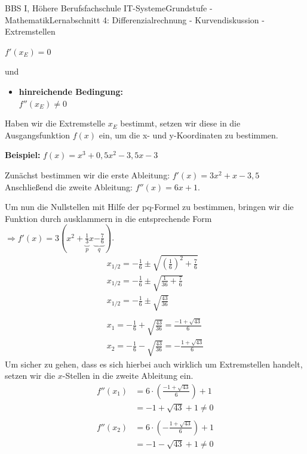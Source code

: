 \documentclass[11pt,twocolumn,oneside,openany,headings=optiontotoc,11pt,numbers=noenddot]{article}
\begin{document}
\begin{worksheet}{BBS I, Höhere Berufsfachschule IT-Systeme}{Grundstufe - Mathematik}{Lernabschnitt 4: Differenzialrechnung - Kurvendiskussion - Extremstellen}
\begin{framed}
\begin{itemize}[label=-]
				\(f'(x_E) = 0\)
			\end{itemize}
			und
			\begin{itemize}[label=-]
				\item  \textbf{hinreichende Bedingung:}\\
				\(f''(x_E) \neq 0\)
			\end{itemize}
		\end{framed}
		\noindent
		Haben wir die Extremstelle \(x_E\) bestimmt, setzen wir diese in die Ausgangsfunktion \(f(x)\) ein, um die x- und y-Koordinaten zu bestimmen.\\
		\par\noindent
		\textbf{Beispiel:} \(f(x) = x^3 + 0,5x^2 - 3,5x -3\)\\
		\par\noindent
		Zunächst bestimmen wir die erste Ableitung: \(f'(x) = 3x^2 + x - 3,5\)\\
		Anschließend die zweite Ableitung: \(f''(x) = 6x + 1\).\\
		\par\noindent
		Um nun die Nullstellen mit Hilfe der pq-Formel zu bestimmen, bringen wir die Funktion durch ausklammern in die entsprechende Form \(\Rightarrow f'(x) = 3(x^2+\underbrace{\frac{1}{3}}_{p}x\underbrace{-\frac{7}{6}}_{q})\).\\
		\begin{align*}
			x_{1/2} = -\frac{1}{6}\pm\sqrt{\left(\frac{1}{6}\right)^2 +\frac{7}{6}}\\
			x_{1/2} = -\frac{1}{6}\pm\sqrt{\frac{1}{36}+\frac{7}{6}}\\
			x_{1/2} = - \frac{1}{6}\pm\sqrt{\frac{43}{36}}\\
			\\
			x_1 = - \frac{1}{6}+\sqrt{\frac{43}{36}} = \frac{-1+\sqrt{43}}{6}\\
			x_2 = - \frac{1}{6}-\sqrt{\frac{43}{36}} = -\frac{1+\sqrt{43}}{6}
		\end{align*}
		Um sicher zu gehen, dass es sich hierbei auch wirklich um Extremstellen handelt, setzen wir die \(x\)-Stellen in die zweite Ableitung ein.\\
		\begin{align*}
			f''(x_1) & = 6\cdot{}\left(\frac{-1+\sqrt{43}}{6}\right) + 1\\
			& = -1+\sqrt{43} + 1 \neq 0\\
			\\
			f''(x_2) &=  6\cdot{}\left(-\frac{1+\sqrt{43}}{6}\right) + 1\\
			& = -1-\sqrt{43} + 1 \neq 0\\

\end{align*}
\end{worksheet}
\end{document}
